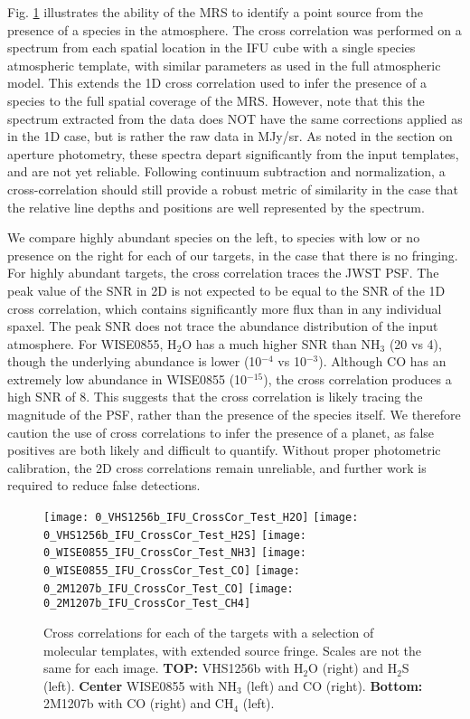 Fig. \ref{fig:2dccmap} illustrates the ability of the MRS to identify a point source from the presence of a species in the atmosphere.
The cross correlation was performed on a spectrum from each spatial location in the IFU cube with a single species atmospheric template, with similar parameters as used in the full atmospheric model.
This extends the 1D cross correlation used to infer the presence of a species to the full spatial coverage of the MRS.
However, note that this the spectrum extracted from the data does NOT have the same corrections applied as in the 1D case, but is rather the raw data in MJy/sr.
As noted in the section on aperture photometry, these spectra depart significantly from the input templates, and are not yet reliable.
Following continuum subtraction and normalization, a cross-correlation should still provide a robust metric of similarity in the case that the relative line depths and positions are well represented by the spectrum.

We compare highly abundant species on the left, to species with low or no presence on the right for each of our targets, in the case that there is no fringing.
For highly abundant targets, the cross correlation traces the JWST PSF.
The peak value of the SNR in 2D is not expected to be equal to the SNR of the 1D cross correlation, which contains significantly more flux than in any individual spaxel.
The peak SNR does not trace the abundance distribution of the input atmosphere.
For WISE0855, H$_{2}$O has a much higher SNR than NH$_{3}$ (20 vs 4), though the underlying abundance is lower (10$^{-4}$ vs 10$^{-3}$).
Although CO has an extremely low abundance in WISE0855 (10$^{-15}$), the cross correlation produces a high SNR of 8.
This suggests that the cross correlation is likely tracing the magnitude of the PSF, rather than the presence of the species itself.
We therefore caution the use of cross correlations to infer the presence of a planet, as false positives are both likely and difficult to quantify.
Without proper photometric calibration, the 2D cross correlations remain unreliable, and further work is required to reduce false detections.
\begin{figure}[t]
	\centering
	\texttt{[image: 0\_VHS1256b\_IFU\_CrossCor\_Test\_H2O]}
	\texttt{[image: 0\_VHS1256b\_IFU\_CrossCor\_Test\_H2S]}
	\texttt{[image: 0\_WISE0855\_IFU\_CrossCor\_Test\_NH3]}
	\texttt{[image: 0\_WISE0855\_IFU\_CrossCor\_Test\_CO]}
	\texttt{[image: 0\_2M1207b\_IFU\_CrossCor\_Test\_CO]}
	\texttt{[image: 0\_2M1207b\_IFU\_CrossCor\_Test\_CH4]}
	\caption{Cross correlations for each of the targets with a selection of molecular templates, with extended source fringe. Scales are not the same for each image. \textbf{TOP:} VHS1256b with H$_2$O (right) and H$_{2}$S (left). \textbf{Center} WISE0855 with NH$_{3}$ (left) and CO (right). \textbf{Bottom:} 2M1207b with CO (right) and CH$_{4}$ (left).}
	\label{fig:2dccmap}
\end{figure}
